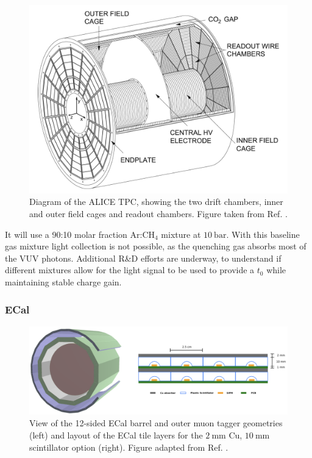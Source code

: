\begin{figure}[t]
	\centering
	\includegraphics[width=0.7\linewidth]{Images/ND-GAr/alice_tpc}
	\caption[Diagram of the ALICE TPC, showing the two drift chambers, inner and outer field cages and readout chambers.]{Diagram of the ALICE TPC, showing the two drift chambers, inner and outer field cages and readout chambers. Figure taken from Ref. \cite{DUNE2021NDCDR}.}
	\label{fig:alice_tpc}
\end{figure}

It will use a 90:10 molar fraction $\mathrm{Ar}$:$\mathrm{CH}_{4}$ mixture at $10~\mathrm{bar}$. With this baseline gas mixture light collection is not possible, as the quenching gas absorbs most of the VUV photons. Additional R\&D efforts are underway, to understand if different mixtures allow for the light signal to be used to provide a $t_{0}$ while maintaining stable charge gain.

\subsubsection{ECal}

\begin{figure}[t]
	\centering
	\includegraphics[width=0.99\linewidth]{Images/ND-GAr/ndgar_ecal}
	\caption[Diagram of the ALICE TPC, showing the two drift chambers, inner and outer field cages and readout chambers.]{View of the 12-sided ECal barrel and outer muon tagger geometries (left) and layout of the ECal tile layers for the $2~\mathrm{mm}$ Cu, $10~\mathrm{mm}$ scintillator option (right). Figure adapted from Ref. \cite{DUNE2021NDCDR}.}
	\label{fig:ndgar_ecal}
\end{figure}

